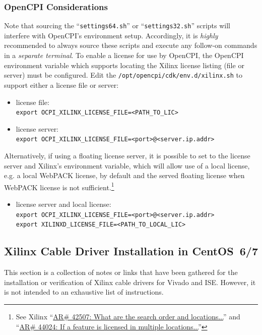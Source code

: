 \subsubsection{OpenCPI Considerations}
Note that sourcing the ``\verb+settings64.sh+'' or ``\verb+settings32.sh+'' scripts will interfere with OpenCPI's environment setup. Accordingly, it is \textit{highly} recommended to always source these scripts and execute any follow-on commands in a \textit{separate terminal}. \medskip\newline
To enable a license for use by OpenCPI, the OpenCPI environment variable which supports locating the Xilinx license listing (file or server) must be configured. Edit the \verb+/opt/opencpi/cdk/env.d/xilinx.sh+ to support either a license file or server: 
\begin{itemize}
\item license file: 
\\ \verb+export OCPI_XILINX_LICENSE_FILE=<PATH_TO_LIC>+
\item license server:
\\ \verb+export OCPI_XILINX_LICENSE_FILE=<port>@<server.ip.addr>+
\end{itemize}
Alternatively, if using a floating license server, it is possible to set to the license server and Xilinx's environment variable, which will allow use of a local license, e.g. a local WebPACK license, by default and the served floating license when WebPACK license is not sufficient.\footnote{See Xilinx ``\href{https://www.xilinx.com/support/answers/42507.html}{AR\# 42507: What are the search order and locations...}'' and ``\href{https://www.xilinx.com/support/answers/44024.html}{AR\# 44024: If a feature is licensed in multiple locations...}''} \medskip
\begin{itemize}
\item license server and local license:
\\ \verb+export OCPI_XILINX_LICENSE_FILE=<port>@<server.ip.addr>+ \\ \verb+export XILINXD_LICENSE_FILE=<PATH_TO_LOCAL_LIC>+
\end{itemize}


\subsection{Xilinx Cable Driver Installation in CentOS~6/7}
\label{sec:cable}
This section is a collection of notes or links that have been gathered for the installation or verification of Xilinx cable drivers for Vivado and ISE. However, it is not intended to an exhaustive list of instructions.
